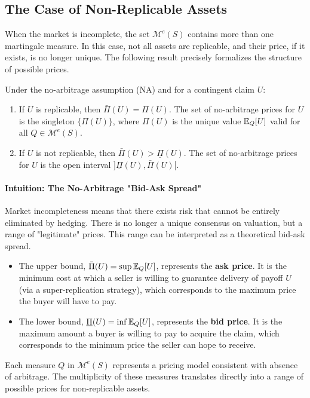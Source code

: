 \subsection{The Case of Non-Replicable Assets}
When the market is incomplete, the set $\mathcal{M}^e(S)$ contains more than one martingale measure. In this case, not all assets are replicable, and their price, if it exists, is no longer unique. The following result precisely formalizes the structure of possible prices.

\begin{proposition}
Under the no-arbitrage assumption (NA) and for a contingent claim $U$:
\begin{enumerate}
    \item[(a)] If $U$ is replicable, then $\bar{\Pi}(U) = \Pi(U)$. The set of no-arbitrage prices for $U$ is the singleton $\{\Pi(U)\}$, where $\Pi(U)$ is the unique value $\mathbb{E}_Q[U]$ valid for all $Q \in \mathcal{M}^e(S)$.
    \item[(b)] If $U$ is not replicable, then $\bar{\Pi}(U) > \underline{\Pi}(U)$. The set of no-arbitrage prices for $U$ is the open interval $]\underline{\Pi}(U), \bar{\Pi}(U)[$.
\end{enumerate}
\end{proposition}

\paragraph*{Intuition: The No-Arbitrage "Bid-Ask Spread"}
Market incompleteness means that there exists risk that cannot be entirely eliminated by hedging. There is no longer a unique consensus on valuation, but a range of "legitimate" prices. This range can be interpreted as a theoretical bid-ask spread.
\begin{itemize}
    \item The upper bound, $\bar{\Pi}(U) = \sup \mathbb{E}_Q[U]$, represents the \textbf{ask price}. It is the minimum cost at which a seller is willing to guarantee delivery of payoff $U$ (via a super-replication strategy), which corresponds to the maximum price the buyer will have to pay.
    \item The lower bound, $\underline{\Pi}(U) = \inf \mathbb{E}_Q[U]$, represents the \textbf{bid price}. It is the maximum amount a buyer is willing to pay to acquire the claim, which corresponds to the minimum price the seller can hope to receive.
\end{itemize}
Each measure $Q$ in $\mathcal{M}^e(S)$ represents a pricing model consistent with absence of arbitrage. The multiplicity of these measures translates directly into a range of possible prices for non-replicable assets.

